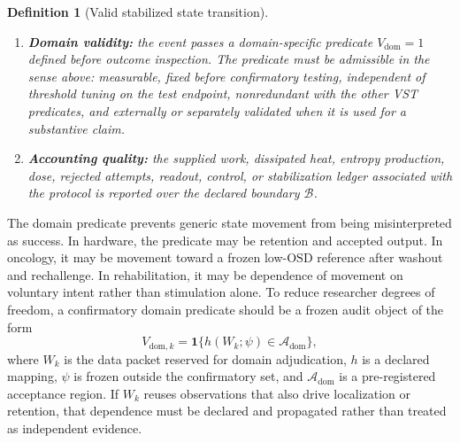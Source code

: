 \documentclass[11pt,a4paper]{article}
\newtheorem{definition}{Definition}
\newcommand{\OSD}{\ensuremath{\mathrm{OSD}}}
\newcommand{\1}{\mathbf{1}}
\begin{document}
\begin{definition}[Valid stabilized state transition]
\begin{enumerate}
  \[
    T^{(j)}_{\mathrm{return}}=\inf\{t>T^{(j)}_{\mathrm{exit}}:X_t\in C_j\}
  \]
  and report it as a distinct property.
  If $X_t$ is latent, persistence must also be evaluated through a filtering or smoothing rule, a calibrated observed-state surrogate, or a censoring rule for unresolved retention windows.
  \item \textbf{Domain validity:} the event passes a domain-specific predicate $V_{\mathrm{dom}}=1$ defined before outcome inspection. The predicate must be admissible in the sense above: measurable, fixed before confirmatory testing, independent of threshold tuning on the test endpoint, nonredundant with the other VST predicates, and externally or separately validated when it is used for a substantive claim.
  \item \textbf{Accounting quality:} the supplied work, dissipated heat, entropy production, dose, rejected attempts, readout, control, or stabilization ledger associated with the protocol is reported over the declared boundary $\mathcal{B}$.
\end{enumerate}
\end{definition}

The domain predicate prevents generic state movement from being misinterpreted as success. In hardware, the predicate may be retention and accepted output. In oncology, it may be movement toward a frozen low-\OSD{} reference after washout and rechallenge. In rehabilitation, it may be dependence of movement on voluntary intent rather than stimulation alone. To reduce researcher degrees of freedom, a confirmatory domain predicate should be a frozen audit object of the form
\[
  V_{\mathrm{dom},k}=\1\{h(W_k;\psi)\in\mathcal{A}_{\mathrm{dom}}\},
\]
where $W_k$ is the data packet reserved for domain adjudication, $h$ is a declared mapping, $\psi$ is frozen outside the confirmatory set, and $\mathcal{A}_{\mathrm{dom}}$ is a pre-registered acceptance region. If $W_k$ reuses observations that also drive localization or retention, that dependence must be declared and propagated rather than treated as independent evidence.
\end{document}
